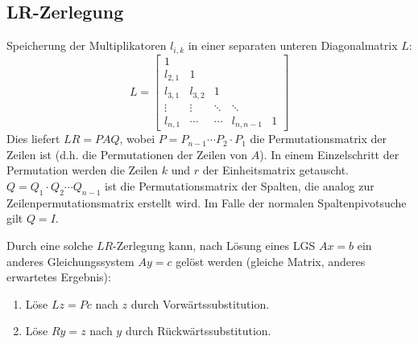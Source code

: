 \documentclass[a4paper, 11pt, accentcolor = tud3b]{tudreport}
\begin{document}
	        \subsection{LR-Zerlegung}
	            Speicherung der Multiplikatoren \( l_{i,k} \) in einer separaten unteren Diagonalmatrix \(L\):
	            \begin{equation*}
		            L =
		            \begin{bmatrix}
		            	1       &         &        &           &  \\
		            	l_{2,1} & 1       &        &           &  \\
		            	l_{3,1} & l_{3,2} & 1      &           &  \\
		            	\vdots  & \vdots  & \ddots & \ddots    &  \\
		            	l_{n,1} & \cdots  & \cdots & l_{n,n-1} & 1
		            \end{bmatrix}
	            \end{equation*}
	            Dies liefert \( LR = PAQ \), wobei \( P = P_{n-1} \cdots P_2 \cdot P_1 \) die Permutationsmatrix der Zeilen ist (d.h. die Permutationen der Zeilen von \(A\)). In einem Einzelschritt der Permutation werden die Zeilen \(k\) und \(r\) der Einheitsmatrix getauscht. \( Q = Q_1 \cdot Q_2 \cdots Q_{n-1} \) ist die Permutationsmatrix der Spalten, die analog zur Zeilenpermutationsmatrix erstellt wird. Im Falle der normalen Spaltenpivotsuche gilt \( Q = I \).
	            
	            Durch eine solche \(LR\)-Zerlegung kann, nach Lösung eines LGS \( Ax = b \) ein anderes Gleichungssystem \( Ay = c \) gelöst werden (gleiche Matrix, anderes erwartetes Ergebnis):
	            \begin{enumerate}
	            	\item Löse \( Lz = Pc \) nach \(z\) durch Vorwärtssubstitution.
	            	\item Löse \( Ry = z \) nach \(y\) durch Rückwärtssubstitution.
	            \end{enumerate}
	
\end{document}
